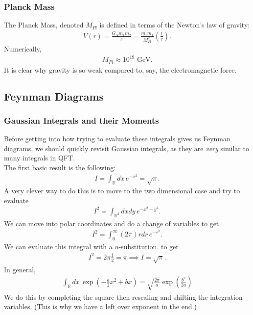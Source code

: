 \documentclass{book}
\theoremstyle{definition}
\newcommand{\f}[2]{\frac{#1}{#2}}
\newcommand{\lp}{\left(}
\newcommand{\rp}{\right)}
\begin{document}
\subsubsection{Planck Mass}

The Planck Mass, denoted $M_{Pl}$ is defined in terms of the Newton's law of gravity:
\begin{align}
V(r) = \f{G_N m_1 m_2}{r} = \f{m_1 m_1}{M^2_{Pl}} \lp \f{1}{r}\rp.
\end{align}
Numerically, 
\begin{align}
M_{Pl} \approx 10^{19} \text{ GeV}.
\end{align}
It is clear why gravity is so weak compared to, say, the electromagnetic force. 







\newpage


\subsection{Feynman Diagrams}







\subsubsection{Gaussian Integrals and their Moments}


Before getting into how trying to evaluate these integrals gives us Feynman diagrams, we should quickly revisit Gaussian integrals, as they are \textit{very} similar to many integrals in QFT.\\

The first basic result is the following:
\begin{align}
I = \int_\mathbb{R}dx\, e^{-x^2} = \sqrt{\pi}.
\end{align}
A very clever way to do this is to move to the two dimensional case and try to evaluate
\begin{align}
I^2 = \int_{\mathbb{R}^2} dxdy\, e^{-x^2 - y^2}.
\end{align}
We can move into polar coordinates and do a change of variables to get
\begin{align}
I^2 = \int_0^\infty (2\pi) rdr\,e^{-r^2}.
\end{align}
We can evaluate this integral with a $u$-substitution. to get
\begin{align}
I^2 = 2\pi \f{1}{2} = \pi \implies I = \sqrt{\pi}.
\end{align}
In general,
\begin{align}
\boxed{\int_\mathbb{R} dx\, \exp\lp -\f{a}{2}x^2 + bx \rp = \sqrt{\f{2\pi}{a}} \exp\lp \f{b^2}{2a} \rp }
\end{align}
We do this by completing the square then rescaling and shifting the integration variables. (This is why we have a left over exponent in the end.)\\
\end{document}
